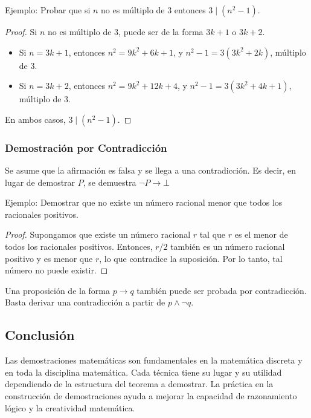 \begin{exampleblock}{Ejemplo: Probar que si $n$ no es múltiplo de 3\text{,} entonces $3 \mid (n^2 - 1)$.}

\begin{proof}
    Si $n$ no es múltiplo de 3, puede ser de la forma $3k+1$ o $3k+2$.
    \begin{itemize}
        \item Si $n = 3k+1$, entonces $n^2 = 9k^2 + 6k + 1$, y $n^2 - 1 = 3(3k^2 + 2k)$, múltiplo de 3.
        \item Si $n = 3k+2$, entonces $n^2 = 9k^2 + 12k + 4$, y $n^2 - 1 = 3(3k^2 + 4k + 1)$, múltiplo de 3.
    \end{itemize}
    En ambos casos, $3 \mid (n^2 - 1)$.
\end{proof}
\end{exampleblock}

\subsubsection{Demostración por Contradicción}

Se asume que la afirmación es falsa y se llega a una contradicción. Es decir, en lugar de demostrar $P$, se demuestra $\neg P \to \bot$

\begin{exampleblock}{Ejemplo: Demostrar que no existe un número racional menor que todos los racionales positivos.}

\begin{proof}
    Supongamos que existe un número racional $r$ tal que $r$ es el menor de todos los racionales positivos.
    Entonces, $r/2$ también es un número racional positivo y es menor que $r$, lo que contradice la suposición.
    Por lo tanto, tal número no puede existir.
\end{proof}
\end{exampleblock}

Una proposición de la forma $p \rightarrow q$ también puede ser probada por
contradicción. Basta derivar una contradicción a partir de $p \wedge \neg q$.

\subsection{Conclusión}

Las demostraciones matemáticas son fundamentales en la matemática discreta y en toda la disciplina matemática.
Cada técnica tiene su lugar y su utilidad dependiendo de la estructura del teorema a demostrar. La práctica en la construcción de demostraciones ayuda a mejorar la capacidad de razonamiento lógico y la creatividad matemática.

